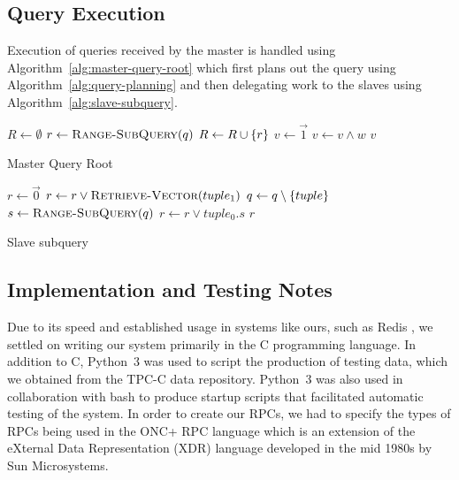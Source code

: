 \subsection{Query Execution}
Execution of queries received by the master is handled using
Algorithm~\ref{alg:master-query-root} which first plans out the query using
Algorithm~\ref{alg:query-planning} and then delegating work to the slaves using
Algorithm~\ref{alg:slave-subquery}.
%
\begin{algorithm}
    \begin{algorithmic}
            \State $R \gets \emptyset$
                \State $r \gets \Call{Range-SubQuery}{q}$
                \State $R \gets R \cup \left\{r\right\}$
            \EndFor
            \State $v \gets \vec{1}$
                \State $v \gets v \land w$
            \EndFor
            \State \Return $v$
        \EndProcedure
    \end{algorithmic}
    \caption{Master Query Root}
    \label{alg:master-query-root}
\end{algorithm}
%
\begin{algorithm}
    \begin{algorithmic}
            \State $r \gets \vec{0}$
                    \State $r \gets r \lor \Call{Retrieve-Vector}{tuple_1}$
                    \State $q \gets q \setminus \left\{tuple\right\}$
                \Else
                    \State $s \gets \Call{Range-SubQuery}{q}$
                    \State $r \gets r \lor tuple_0.s$
                    \State \Break
                \EndIf
            \EndFor
            \State \Return $r$
        \EndProcedure
    \end{algorithmic}
    \caption{Slave subquery}
    \label{alg:slave-subquery}
\end{algorithm}
%
\subsection{Implementation and Testing Notes}
Due to its speed and established usage in systems like ours, such as Redis
\cite{redis}, we settled on writing our system primarily in the C programming
language. In addition to C, Python~3 was used to script the production of
testing data, which we obtained from the TPC-C data repository. Python~3 was
also used in collaboration with bash to produce startup scripts that
facilitated automatic testing of the system. In order to create our RPCs, we
had to specify the types of RPCs being used in the ONC+ RPC language which is
an extension of the eXternal Data Representation (XDR) language developed in
the mid 1980s by Sun Microsystems.
